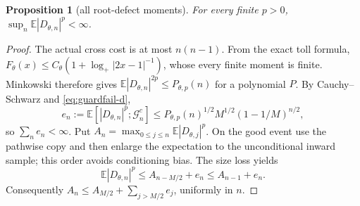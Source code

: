 \documentclass[11pt]{article}
\numberwithin{equation}{section}
\newtheorem{proposition}[theorem]{Proposition}
\newcommand{\1}{\mathbf 1}\newcommand{\F}{\mathcal F}\newcommand{\D}{\mathcal D}
\begin{document}
\begin{proposition}[all root-defect moments]\label{prop:defect-moments-d}
For every finite $p>0$, $\sup_n\mathbb E|D_{\theta,n}|^p<\infty$.
\end{proposition}
\begin{proof}
The actual cross cost is at most $n(n-1)$.  From the exact toll formula,
$F_\theta(x)\le C_\theta(1+\log_+|2x-1|^{-1})$, whose every finite moment is
finite.  Minkowski therefore gives
$\mathbb E|D_{\theta,n}|^{2p}\le P_{\theta,p}(n)$ for a polynomial $P$.
By Cauchy--Schwarz and \eqref{eq:guardfail-d},
\begin{equation}e_n:=\mathbb E[|D_{\theta,n}|^p;\mathcal G_n^c]
 \le P_{\theta,p}(n)^{1/2}M^{1/2}(1-1/M)^{n/2},              \label{eq:en}
\end{equation}
so $\sum_ne_n<\infty$.  Put $A_n=\max_{0\le j\le n}\mathbb E|D_{\theta,j}|^p$.
On the good event use the pathwise copy and then enlarge the expectation to
the unconditional inward sample; this order avoids conditioning bias.  The
size loss yields
\begin{equation}
 \mathbb E|D_{\theta,n}|^p\le A_{n-M/2}+e_n\le A_{n-1}+e_n.
\end{equation}
Consequently $A_n\le A_{M/2}+\sum_{j>M/2}e_j$, uniformly in $n$.
\end{proof}
\end{document}
